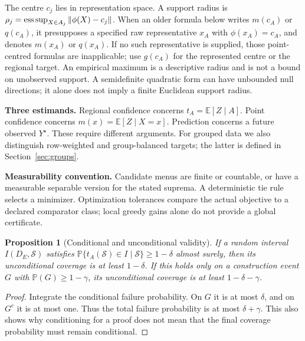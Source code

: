 \documentclass[11pt,a4paper]{article}
\newcommand{\E}{\mathbb E}\newcommand{\Pp}{\mathbb P}
\newcommand{\Sref}[1]{Section~\ref{#1}}
\numberwithin{equation}{section}
\newtheorem{proposition}[theorem]{Proposition}
\theoremstyle{definition}\newtheorem{definition}[theorem]{Definition}
\theoremstyle{remark}\newtheorem{remark}[theorem]{Remark}
\begin{document}
The centre $c_j$ lies in representation space. A support radius is
$\rho_j=\mathop{\rm ess\,sup}_{X\in A_j}\|\phi(X)-c_j\|$.
When an older formula below writes $m(c_A)$ or $q(c_A)$, it presupposes a
specified raw representative $x_A$ with $\phi(x_A)=c_A$, and denotes $m(x_A)$ or
$q(x_A)$. If no such representative is supplied, those point-centred formulas
are inapplicable; use $g(c_A)$ for the represented centre or the regional target.
An empirical maximum is a descriptive radius and is not a bound on unobserved support. A semidefinite quadratic form can have unbounded null directions; it alone does not imply a finite Euclidean support radius.

\textbf{Three estimands.} Regional confidence concerns $t_A=\E[Z\mid A]$. Point confidence concerns $m(x)=\E[Z\mid X=x]$. Prediction concerns a future observed $Y^\star$. These require different arguments. For grouped data we also distinguish row-weighted and group-balanced targets; the latter is defined in \Sref{sec:groups}.

\textbf{Measurability convention.} Candidate menus are finite or countable, or have a measurable separable version for the stated suprema. A deterministic tie rule selects a minimizer. Optimization tolerances compare the actual objective to a declared comparator class; local greedy gains alone do not provide a global certificate.

\begin{proposition}[Conditional and unconditional validity]\label{prop:tower}
If a random interval $I(D_E,\mathcal S)$ satisfies
$\Pp\{t_A(\mathcal S)\in I\mid\mathcal S\}\ge1-\delta$ almost surely, then its unconditional coverage is at least $1-\delta$. If this holds only on a construction event $G$ with $\Pp(G)\ge1-\gamma$, its unconditional coverage is at least $1-\delta-\gamma$.
\end{proposition}
\begin{proof}
Integrate the conditional failure probability. On $G$ it is at most $\delta$, and on $G^c$ it is at most one. Thus the total failure probability is at most $\delta+\gamma$. This also shows why conditioning for a proof does not mean that the final coverage probability must remain conditional.
\end{proof}
\end{document}
